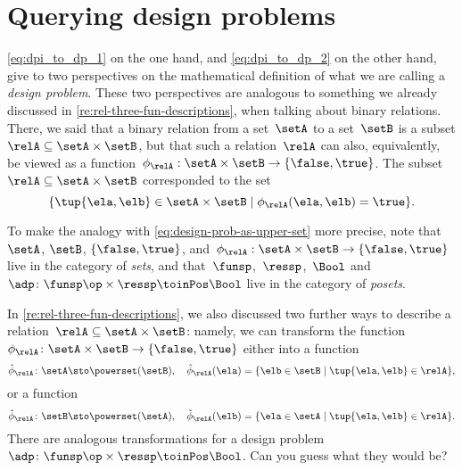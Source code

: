 

\section{Querying design problems}
\label{sec:dp-querying}



\cref{eq:dpi_to_dp_1} on the one hand, and \cref{eq:dpi_to_dp_2} on the other hand, give to two perspectives on the mathematical definition of what we are calling a \emph{design problem}.
These two perspectives are analogous to something we already discussed in \cref{re:rel-three-fun-descriptions}, when talking about binary relations.
There, we said that a binary relation from a set~$\setA$ to a set~$\setB$ is a subset $\relA \subseteq \setA \times \setB$,
but that such a relation~$\relA$ can also, equivalently, be viewed as a function~$\phi_{\relA}: \setA \times \setB \to \{ \false, \true \}$.
The subset~$\relA \subseteq \setA \times \setB$ corresponded to the set
\begin{equation}
    \{ \tup{\ela, \elb} \in \setA \times \setB \mid \phi_{\relA}(\ela, \elb) = \true \}.
\end{equation}

To make the analogy with \cref{eq:design-prob-as-upper-set} more precise, note that~$\setA$, $\setB$, $\{ \false, \true \}$,
and~$\phi_{\relA}: \setA \times \setB \to \{ \false, \true \}$ live in the category of \emph{sets},
and that~$\funsp$,~$\ressp$,~$\Bool$ and~$\adp\colon \funsp\op \times \ressp\toinPos \Bool$ live in the category of \emph{posets}.

In \cref{re:rel-three-fun-descriptions}, we also discussed two further ways to describe a relation~$\relA \subseteq \setA \times \setB$:
namely, we can transform the function~$\phi_{\relA}\colon \setA \times \setB \to \{ \false, \true \}$ either into a function
\begin{equation}
    \label{eq:curried-relation-again}
    \hat \phi_{\relA} \colon \setA \sto \powerset (\setB), \quad \hat \phi_{\relA} (\ela) = \{ \elb \in \setB \mid \tup{\ela, \elb} \in \relA \},
\end{equation}
or a function
\begin{equation}
    \label{eq:co-curried-relation-again}
    \check \phi_{\relA} \colon \setB \sto \powerset (\setA), \quad \check \phi_{\relA} (\elb) = \{ \ela \in \setA \mid \tup{\ela, \elb} \in \relA \}.
\end{equation}
There are analogous transformations for a design problem~$\adp\colon \funsp\op \times \ressp\toinPos \Bool$. Can you guess what they would be?

